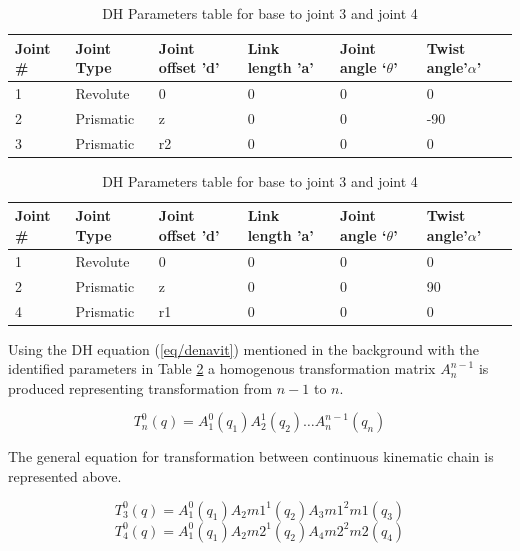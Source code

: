 \documentclass{UoNMCHA}
\numberwithin{equation}{section}
\begin{document}
	\begin{table}[H] \centering 
		\caption{DH Parameters table for base to joint 3 and joint 4}
		\begin{tabular}{llllll}
			\hline
			Joint \# & Joint Type & Joint offset 'd' & Link length 'a' & Joint angle ‘$\theta$’ & Twist angle'$\alpha$' \\ \hline
			1        & Revolute   & 0                & 0               & 0               & 0              \\
			2        & Prismatic  & z                & 0               & 0              & -90            \\
			3        & Prismatic  & r2               & 0               & 0               & 0             
		\end{tabular} \vspace{5mm}
		
		\begin{tabular}{llllll}
			\hline
			Joint \# & Joint Type & Joint offset 'd' & Link length 'a' & Joint angle ‘$\theta$’ & Twist angle'$\alpha$' \\ \hline
			1        & Revolute   & 0                & 0               & 0               & 0              \\
			2        & Prismatic  & z                & 0               & 0              & 90            \\
			4        & Prismatic  & r1               & 0               & 0               & 0             
		\end{tabular}
		\label{tab/joints}
	\end{table}
	
	
	Using the DH equation (\ref{eq/denavit}) mentioned in the background with the identified parameters in Table \ref{tab/joints} a homogenous transformation matrix $A_{n}^{n-1}$ is produced representing transformation from $n-1$ to $n$. 
	
	\begin{equation}
	T_n^0 (q)=A_1^0 (q_1 ) A_2^1 (q_2 ) \dots A_{n}^{n-1} (q_n )
	\end{equation}
	
	The general equation for transformation between continuous kinematic chain is represented above.
	
	\begin{equation}
	T_3^0 (q)=A_1^0 (q_1 ) A_2m1^1 (q_2 ) A_3m1^2m1 (q_3 )
	\end{equation}
	\begin{equation}
	T_4^0 (q)=A_1^0 (q_1 ) A_2m2^1 (q_2 ) A_4m2^2m2 (q_4 )
	\end{equation}
	
\end{document}
